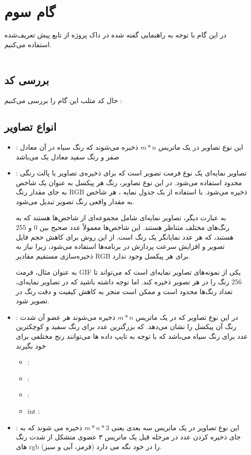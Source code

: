 \section{گام سوم}
در این گام با توجه به راهنمایی گفته شده در داک پروژه از تابع پیش تعریف‌شده 
استفاده می‌کنیم.
\\
\\
\subsection{بررسی کد}
حال کد متلب این گام را بررسی می‌کنیم
:
\lr{}

\subsection{انواع تصاویر}
\begin{itemize}
    \item 
    : 
    این نوع تصاویر در یک ماتریس 
    \(m * n\)
    ذخیره می‌شوند که رنگ سیاه در آن معادل صفر و رنگ سفید معادل یک می‌باشد
    \item  
    :
    تصاویر نمایه‌ای یک نوع فرمت تصویر است که برای ذخیره‌ی تصاویر با پالت رنگی محدود استفاده می‌شود. در این نوع تصاویر، رنگ هر پیکسل به عنوان یک شاخص به جای مقدار رنگ RGB ذخیره می‌شود. با استفاده از یک جدول نمایه ، هر شاخص به مقدار واقعی رنگ تصویر تبدیل می‌شود.

به عبارت دیگر، تصاویر نمایه‌ای شامل مجموعه‌ای از شاخص‌ها هستند که به رنگ‌های مختلف متناظر هستند. این شاخص‌ها معمولاً عدد صحیح بین 0 و 255 هستند، که هر عدد نمایانگر یک رنگ است. از این روش برای کاهش حجم فایل تصویر و افزایش سرعت پردازش در برنامه‌ها استفاده می‌شود، زیرا نیاز به ذخیره‌سازی مستقیم مقادیر RGB برای هر پیکسل وجود ندارد.

به عنوان مثال، فرمت GIF یکی از نمونه‌های تصاویر نمایه‌ای است که می‌تواند تا 256 رنگ را در هر تصویر ذخیره کند. اما توجه داشته باشید که در تصاویر نمایه‌ای، تعداد رنگ‌ها محدود است و ممکن است منجر به کاهش کیفیت و دقت رنگ در تصویر شود.
    \item
     : 
    در
    این نوع تصاویر
    که در یک ماتریس
        \(m * n\)
ذخیره می‌شوند
    هر عضو آن شدت رنگ آن پیکسل را نشان می‌دهد.
   که بزرگترین عدد برای رنگ سفید و کوچکترین عدد برای رنگ سیاه می‌باشد 
   که با توجه به تایپ داده ها می‌توانند رنج مختلفی برای خود بگیرند 
   \begin{itemize}
       \item {} : \lr{[0,1]}
       \item {} : \lr{[0,..,255]}
        \item {} : \lr{ [0,...,65535]}
        \item int : \lr{[-32768,...,32768]}
   \end{itemize}
   \item {}
   : 
   این نوع تصاویر در یک ماتریس سه بعدی یعنی 
       \(m * n * 3\)
       ذخیره می شوند که به جای ذخیره کردن عدد در مرحله قبل یک ماتریس ۳ عضوی 
       متشکل از شدت رنگ های
       rgb
       (قرمز، آبی و سبز)
       را در خود نگه می دارد.

\end{itemize}
